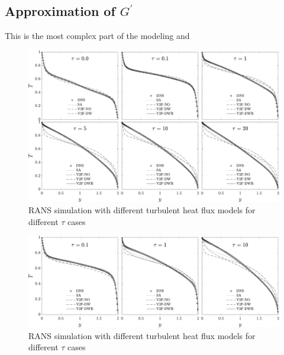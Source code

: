 \documentclass[10pt]{article}
\begin{document}
\subsection*{Approximation of $G^\prime$}
This is the most complex part of the modeling and 

\begin{figure}[h]
\centering
\includegraphics[width=1.1\textwidth]{../solution/Figures/Tempgrey.pdf}
\caption{\noindent RANS simulation with different turbulent heat flux models for different $\tau$ cases}
\label{constk}
\end{figure}

\begin{figure}[h]
\centering
\includegraphics[width=1.1\textwidth]{../solution/Figures_r/Tempvar.pdf}
\caption{\noindent RANS simulation with different turbulent heat flux models for different $\tau$ cases}
\label{vark}
\end{figure}
\end{document}

